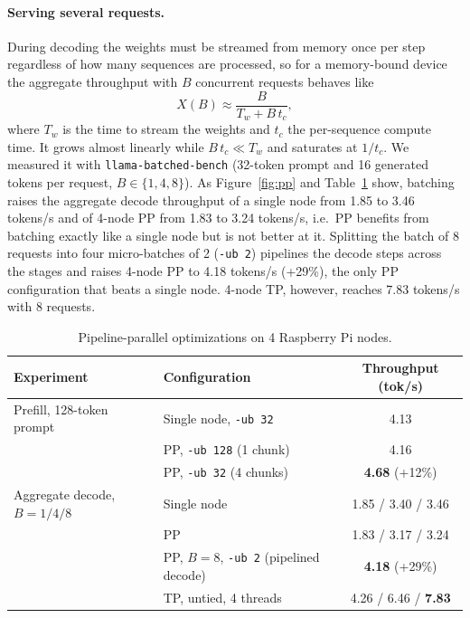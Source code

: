 \documentclass[11pt,a4paper]{article}
\begin{document}
\paragraph{Serving several requests.} During decoding the weights must be streamed from memory once per step regardless of how many sequences are processed, so for a memory-bound device the aggregate throughput with $B$ concurrent requests behaves like
\begin{equation}
X(B) \approx \frac{B}{T_{w} + B\, t_{c}},
\label{eq:batch}
\end{equation}
where $T_w$ is the time to stream the weights and $t_c$ the per-sequence compute time. It grows almost linearly while $B\,t_c \ll T_w$ and saturates at $1/t_c$. We measured it with \texttt{llama-batched-bench} (32-token prompt and 16 generated tokens per request, $B \in \{1,4,8\}$). As Figure~\ref{fig:pp} and Table~\ref{tab:pp} show, batching raises the aggregate decode throughput of a single node from 1.85 to 3.46 tokens/s and of 4-node PP from 1.83 to 3.24 tokens/s, i.e.\ PP benefits from batching exactly like a single node but is not better at it. Splitting the batch of 8 requests into four micro-batches of 2 (\texttt{-ub 2}) pipelines the decode steps across the stages and raises 4-node PP to 4.18 tokens/s (+29\%), the only PP configuration that beats a single node. 4-node TP, however, reaches 7.83 tokens/s with 8 requests.

\begin{table}[H]
\centering
\caption{Pipeline-parallel optimizations on 4 Raspberry Pi nodes.}
\label{tab:pp}
\begin{tabular}{@{}llc@{}}
\toprule
Experiment & Configuration & Throughput (tok/s) \\
\midrule
Prefill, 128-token prompt & Single node, \texttt{-ub 32} & 4.13 \\
 & PP, \texttt{-ub 128} (1 chunk) & 4.16 \\
 & PP, \texttt{-ub 32} (4 chunks) & \textbf{4.68} (+12\%) \\
\midrule
Aggregate decode, $B = 1 / 4 / 8$ & Single node & 1.85 / 3.40 / 3.46 \\
 & PP & 1.83 / 3.17 / 3.24 \\
 & PP, $B=8$, \texttt{-ub 2} (pipelined decode) & \textbf{4.18} (+29\%) \\
 & TP, untied, 4 threads & 4.26 / 6.46 / \textbf{7.83} \\
\bottomrule
\end{tabular}
\end{table}
\end{document}
